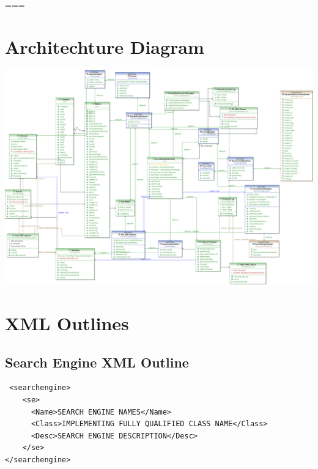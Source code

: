 \cleardoublepage
\begingroup
\advance\textwidth\pdfpagewidth
\hsize=\textwidth\linewidth=\hsize\columnwidth=\hsize
{}\pdfpagewidth

\chapter{Architechture Diagram}
\label{sec:archdesign}
\centering
\includegraphics[height=0.95\textheight]{HighLevelArch.png}
\cleardoublepage
\endgroup

\chapter{XML Outlines}
\section{Search Engine XML Outline}
\label{sec:semanspecxml}
\lstset{language = XML}
\begin{lstlisting}
 <searchengine>
	<se>
	  <Name>SEARCH ENGINE NAMES</Name>
	  <Class>IMPLEMENTING FULLY QUALIFIED CLASS NAME</Class>
	  <Desc>SEARCH ENGINE DESCRIPTION</Desc>
	</se>
</searchengine>
\end{lstlisting}


